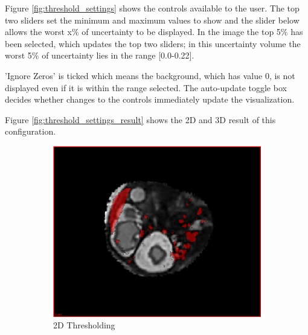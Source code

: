 Figure \ref{fig:threshold_settings} shows the controls available to the user. The top two sliders set the minimum and maximum values to show and the slider below allows the worst x$\%$ of uncertainty to be displayed. In the image the top 5$\%$ has been selected, which updates the top two sliders; in this uncertainty volume the worst 5$\%$ of uncertainty lies in the range [0.0-0.22].

'Ignore Zeros' is ticked which means the background, which has value 0, is not displayed even if it is within the range selected. The auto-update toggle box decides whether changes to the controls immediately update the visualization.

Figure \ref{fig:threshold_settings_result} shows the 2D and 3D result of this configuration.

\begin{figure}[H]
  \centering
  \begin{subfigure}[b]{0.5\textwidth}
    \includegraphics[width=\textwidth]{images/thresholding/thresholding_2d.png}
    \caption{2D Thresholding}\label{fig:threshold_2d}
  \end{subfigure}%
  ~ %
  \begin{subfigure}[b]{0.5\textwidth}

\end{subfigure}
\end{figure}
